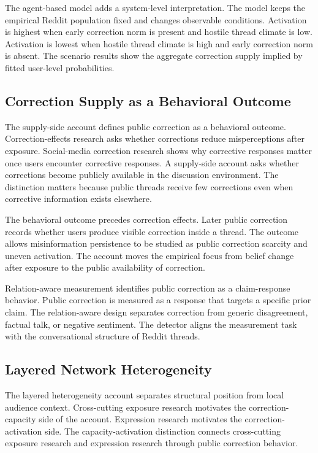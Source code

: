 \documentclass[namedate,unnumsec,webpdf,contemporary,large]{oup-authoring-template}
\begin{document}
The agent-based model adds a system-level interpretation. The model keeps the empirical Reddit population fixed and changes observable conditions. Activation is highest when early correction norm is present and hostile thread climate is low. Activation is lowest when hostile thread climate is high and early correction norm is absent. The scenario results show the aggregate correction supply implied by fitted user-level probabilities.

\subsection{Correction Supply as a Behavioral Outcome}


The supply-side account defines public correction as a behavioral outcome. Correction-effects research asks whether corrections reduce misperceptions after exposure. Social-media correction research shows why corrective responses matter once users encounter corrective responses. A supply-side account asks whether corrections become publicly available in the discussion environment. The distinction matters because public threads receive few corrections even when corrective information exists elsewhere.

The behavioral outcome precedes correction effects. Later public correction records whether users produce visible correction inside a thread. The outcome allows misinformation persistence to be studied as public correction scarcity and uneven activation. The account moves the empirical focus from belief change after exposure to the public availability of correction.

Relation-aware measurement identifies public correction as a claim-response behavior. Public correction is measured as a response that targets a specific prior claim. The relation-aware design separates correction from generic disagreement, factual talk, or negative sentiment. The detector aligns the measurement task with the conversational structure of Reddit threads.

\subsection{Layered Network Heterogeneity}


The layered heterogeneity account separates structural position from local audience context. Cross-cutting exposure research motivates the correction-capacity side of the account. Expression research motivates the correction-activation side. The capacity-activation distinction connects cross-cutting exposure research and expression research through public correction behavior.
\end{document}
